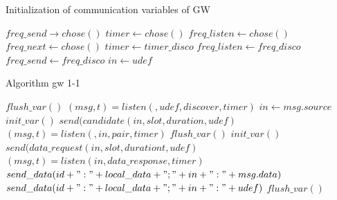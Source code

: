 \documentclass[conference]{IEEEtran}
\begin{document}
\begin{algorithm}
\caption{Initialization of communication variables of GW}\label{alg:initvarlg}
\begin{algorithmic}[1]
\State $freq\_send \rightarrow chose()$
\State $timer \leftarrow chose()$
\State $freq\_listen \leftarrow chose()$
\State $freq\_next \leftarrow chose()$
\EndProcedure
\State
{}
\State $timer \leftarrow timer\_disco$
\State $freq\_listen \leftarrow freq\_disco$
\State $freq\_send \leftarrow freq\_disco$
\State $in \leftarrow udef$
\EndProcedure
\end{algorithmic}
\end{algorithm}

\begin{algorithm}[H]
\caption{Algorithm gw 1-1}\label{alg:gw1-1}
\begin{algorithmic}[1]
\State $flush\_var()$
    \State $(msg,t) = listen(,udef,discover,timer)$
  \EndIf
    \State $in \leftarrow msg.source$
    \State $init\_var()$
    \State $send(candidate(in,slot,duration,udef)$
    \State $(msg,t) = listen(,in,pair,timer)$
      \State $flush\_var()$
    \EndIf
  \EndIf
    \State $init\_var()$
    \State $send(data\_request(in,slot,durationt,udef)$
    \State $(msg,t) = listen(in,data\_response,timer)$
      \State $send\_data(id + ":" + local\_data + ";" + in + ":" + msg.data)$
    \Else
      \State $send\_data(id + ":" + local\_data + ";" + in + ":" + udef)$
      \State $flush\_var()$
    \EndIf
  \EndIf
\EndWhile
\end{algorithmic}
\end{algorithm}
\end{document}
